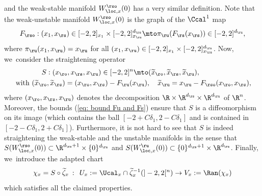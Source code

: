 \begin{appendix}
\[\]
and the weak-stable manifold $ W_{\loc,x}^{\rso} (0)$ has a very similar definition. Note that the weak-unstable manifold $W_{\loc,x}^{\rso} (0)$ is the graph of the $\Ccal^{1}$ map
\[
F_{\rso}: (x_1, x_\rs) \in [-2,2]_{x_1} \times [-2,2]_{x_\ru}^{d_\rs} \mto \pi_\ru (F_\rs (x_\rs)) \in [-2,2]^{d_\ru},
\]
where $\pi_\ru (x_1,x_\ru) = x_\ru$ for all $(x_1,x_\ru) \in [-2,2]_{x_1} \times [-2,2]_{x_\rs}^{d_\ru}$. Now, we~consider the straightening operator
\begin{align*}
& \qquad \qquad S: (x_\ro, x_\rs, x_\ru) \in [-2,2]^{n} \mto (\widetilde{x}_\ro, \widetilde{x}_\rs, \widetilde{x}_\ru), \\
&\text{ with } (\widetilde{x}_\ro, \widetilde{x}_\rs)= (x_\ro, x_\rs) - F_\ru (x_\ru), \quad \widetilde{x}_\ru= x_\ru - F_{\rso} (x_\ro,x_\rs),
\end{align*}
where $(x_\ro, x_\rs,x_\ru)$ denotes the decomposition $\R \times \R^{d_\rs} \times \R^{d_\ru} $ of $\R^n$. Moreover, the bounds (\ref{eq: bound Fu and Fs}) ensure that $S$ is a diffeomorphism on its image (which contains the ball $[-2 + C\delta_1,2 - C\delta_1]$ and is contained in $[-2 - C\delta_1,2 + C\delta_1]$). Furthermore, it is not hard to see that $S$ is indeed straightening the weak-stable and the unstable manifolds in the sense that $ S (W_{\loc,x}^{\rso} (0)) \subset \R^{d_\rs + 1} \times \{0\}^{d_\ru}$ and $ S (W_{\loc,x}^{\ru} (0)) \subset \{0\}^{d_\rs + 1} \times \R^{d_\ru}$. Finally, we~introduce the adapted chart
\[
\chi_x = S \circ \widetilde{\zeta}_x \:: \: \: U_x:= \Ucal_x \cap \widetilde{\zeta}_x^{-1} (]-2,2[^n) \to V_x:= \Ran (\chi_x)
\]
which satisfies all the claimed properties.


\end{appendix}

